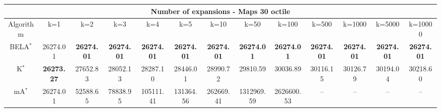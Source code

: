 \begin{tabular}{c|cccccccccccc}\toprule
\multicolumn{13}{c}{Number of expansions - Maps 30 octile}\\ \midrule
Algorithm & k=1 & k=2 & k=3 & k=4 & k=5 & k=10 & k=50 & k=100 & k=500 & k=1000 & k=5000 & k=10000 \\ \midrule
BELA$^*$ & 26274.01 & \textbf{26274.01} & \textbf{26274.01} & \textbf{26274.01} & \textbf{26274.01} & \textbf{26274.01} & \textbf{26274.01} & \textbf{26274.01} & \textbf{26274.01} & \textbf{26274.01} & \textbf{26274.01} & \textbf{26274.01} \\
K$^*$ & \textbf{26273.27} & 27652.83 & 28052.13 & 28287.10 & 28446.01 & 28990.72 & 29810.59 & 30036.89 & 30116.15 & 30126.79 & 30194.04 & 30218.60 \\
mA$^*$ & 26274.01 & 52588.65 & 78838.95 & 105111.41 & 131364.56 & 262669.41 & 1312969.59 & 2626600.53 & -- & -- & -- & -- \\ \bottomrule 
\end{tabular}
